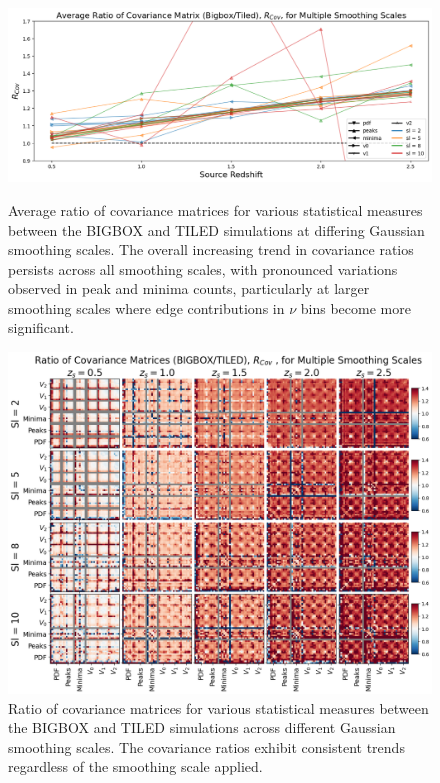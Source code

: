 \begin{figure}[p]
    \centering
    \includegraphics[width=\textwidth]{figures/results/avg_cov_ratio_sl.png}
    \caption[Average BIGBOX/TILED Ratio of Covariance for Multiple Smoothing Scales]
    {Average ratio of covariance matrices for various statistical measures between the BIGBOX and TILED simulations at differing Gaussian smoothing scales. The overall increasing trend in covariance ratios persists across all smoothing scales, with pronounced variations observed in peak and minima counts, particularly at larger smoothing scales where edge contributions in $\nu$ bins become more significant.}
    \label{fig:avg_cov_sl}
    \includegraphics[width=\textwidth]{figures/results/cov_smoothing.png}
    \caption[BIGBOX/TILED Ratio of Covariance for Multiple Smoothing Scales]
    {Ratio of covariance matrices for various statistical measures between the BIGBOX and TILED simulations across different Gaussian smoothing scales. The covariance ratios exhibit consistent trends regardless of the smoothing scale applied.}
    \label{fig:cov_smoothing}
\end{figure}

